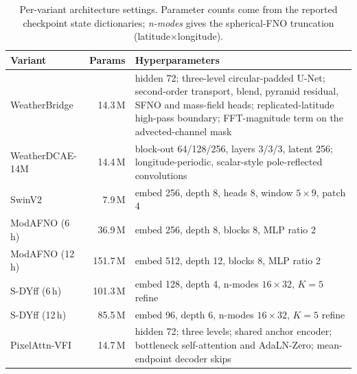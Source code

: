 \begin{table}[!htbp]
\centering
\caption{Per-variant architecture settings. Parameter counts come from the
reported checkpoint state dictionaries; \emph{n-modes} gives the
spherical-FNO truncation (latitude$\times$longitude).}
\label{tab:hyperparams}
\small
\setlength{\tabcolsep}{4pt}
\begin{tabular}{p{}r p{}}
\toprule
\textbf{Variant} & \textbf{Params} & \textbf{Hyperparameters} \\
\midrule
WeatherBridge & 14.3\,M & hidden 72; three-level circular-padded U-Net; second-order transport, blend, pyramid residual, SFNO and mass-field heads; replicated-latitude high-pass boundary; FFT-magnitude term on the advected-channel mask \\
WeatherDCAE-14M & 14.4\,M & block-out 64/128/256, layers 3/3/3, latent 256; longitude-periodic, scalar-style pole-reflected convolutions \\
\midrule
SwinV2 & 7.9\,M & embed 256, depth 8, heads 8, window $5{\times}9$, patch 4 \\
ModAFNO (6\,h) & 36.9\,M & embed 256, depth 8, blocks 8, MLP ratio 2 \\
ModAFNO (12\,h) & 151.7\,M & embed 512, depth 12, blocks 8, MLP ratio 2 \\
S-DYff (6\,h) & 101.3\,M & embed 128, depth 4, n-modes $16{\times}32$, $K{=}5$ refine \\
S-DYff (12\,h) & 85.5\,M & embed 96, depth 6, n-modes $16{\times}32$, $K{=}5$ refine \\
PixelAttn-VFI & 14.7\,M & hidden 72; three levels; shared anchor encoder; bottleneck self-attention and AdaLN-Zero; mean-endpoint decoder skips \\
\bottomrule
\end{tabular}
\end{table}

